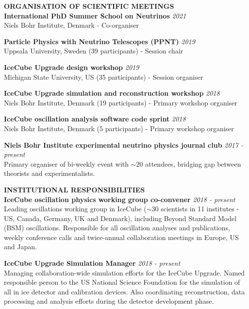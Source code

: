 \documentclass[a4paper,11pt]{article}
\renewcommand{\smallskip} {\vspace{0.1in}}
\begin{document}
\textbf{ORGANISATION OF SCIENTIFIC MEETINGS ~~\hrulefill}\smallskip\\
%
{\bf International PhD Summer School on Neutrinos} \hfill {\em 2021} \\ 
  Niels Bohr Institute, Denmark - Co-organiser
  
{\bf Particle Physics with Neutrino Telescopes (PPNT)} \hfill {\em 2019} \\ 
  Uppsala University, Sweden (39 participants) - Session chair
  
{\bf IceCube Upgrade design workshop} \hfill {\em 2019} \\ 
  Michigan State University, US (35 participants) - Session organiser

{\bf IceCube Upgrade simulation and reconstruction workshop} \hfill {\em 2018} \\ 
  Niels Bohr Institute, Denmark (19 participants) - Primary workshop organiser

{\bf IceCube oscillation analysis software code sprint} \hfill {\em 2018} \\ 
  Niels Bohr Institute, Denmark (5 participants) - Primary workshop organiser

{\bf Niels Bohr Institute experimental neutrino physics journal club} \hfill {\em 2017 - present} \\ 
Primary organiser of bi-weekly event with $\sim20$ attendees, bridging gap between theorists and experimentalists.

  
\textbf{INSTITUTIONAL RESPONSIBILITIES ~~\hrulefill}\smallskip\\
%
{\bf IceCube oscillation physics working group co-convener} \hfill {\em 2018 - present} \\ 
Leading oscillations working group in IceCube ($\sim$30 scientists in 11 institutes - US, Canada, Germany, UK and Denmark), including Beyond Standard Model (BSM) oscillations. Responsible for all oscillation analyses and publications, weekly conference calls and twice-annual collaboration meetings in Europe, US and Japan. 

{\bf IceCube Upgrade Simulation Manager} \hfill {\em 2018 - present} \\ 
Managing collaboration-wide simulation efforts for the IceCube Upgrade. Named responsible person to the US National Science Foundation for the simulation of all in ice detector and calibration devices. Also coordinating reconstruction, data processing and analysis efforts during the detector development phase.
\end{document}
